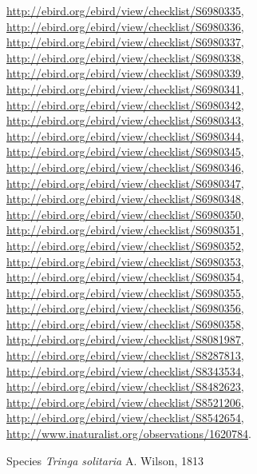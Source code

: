 \documentclass[9pt, article]{memoir}
\begin{document}
\begin{multicols}{2}
\url{http://ebird.org/ebird/view/checklist/S6980335}, 
\url{http://ebird.org/ebird/view/checklist/S6980336}, 
\url{http://ebird.org/ebird/view/checklist/S6980337}, 
\url{http://ebird.org/ebird/view/checklist/S6980338}, 
\url{http://ebird.org/ebird/view/checklist/S6980339}, 
\url{http://ebird.org/ebird/view/checklist/S6980341}, 
\url{http://ebird.org/ebird/view/checklist/S6980342}, 
\url{http://ebird.org/ebird/view/checklist/S6980343}, 
\url{http://ebird.org/ebird/view/checklist/S6980344}, 
\url{http://ebird.org/ebird/view/checklist/S6980345}, 
\url{http://ebird.org/ebird/view/checklist/S6980346}, 
\url{http://ebird.org/ebird/view/checklist/S6980347}, 
\url{http://ebird.org/ebird/view/checklist/S6980348}, 
\url{http://ebird.org/ebird/view/checklist/S6980350}, 
\url{http://ebird.org/ebird/view/checklist/S6980351}, 
\url{http://ebird.org/ebird/view/checklist/S6980352}, 
\url{http://ebird.org/ebird/view/checklist/S6980353}, 
\url{http://ebird.org/ebird/view/checklist/S6980354}, 
\url{http://ebird.org/ebird/view/checklist/S6980355}, 
\url{http://ebird.org/ebird/view/checklist/S6980356}, 
\url{http://ebird.org/ebird/view/checklist/S6980358}, 
\url{http://ebird.org/ebird/view/checklist/S8081987}, 
\url{http://ebird.org/ebird/view/checklist/S8287813}, 
\url{http://ebird.org/ebird/view/checklist/S8343534}, 
\url{http://ebird.org/ebird/view/checklist/S8482623}, 
\url{http://ebird.org/ebird/view/checklist/S8521206}, 
\url{http://ebird.org/ebird/view/checklist/S8542654}, 
\url{http://www.inaturalist.org/observations/1620784}.

\vspace{6pt}\noindent\hspace{36pt}Species \textit{Tringa solitaria} A. Wilson, 1813



\end{multicols}
\end{document}

